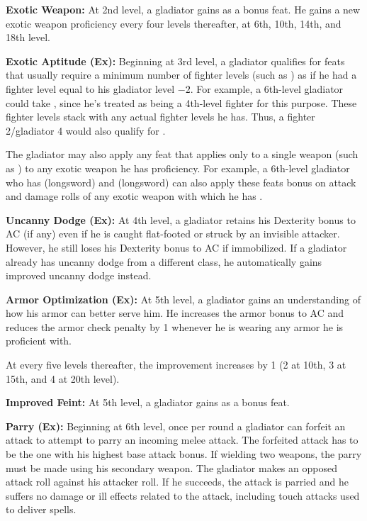 \textbf{Exotic Weapon:} At 2nd level, a gladiator gains  as a bonus feat. He gains a new exotic weapon proficiency every four levels thereafter, at 6th, 10th, 14th, and 18th level.

\textbf{Exotic Aptitude (Ex):} Beginning at 3rd level, a gladiator qualifies for feats that usually require a minimum number of fighter levels (such as ) as if he had a fighter level equal to his gladiator level $-2$. For example, a 6th-level gladiator could take , since he's treated as being a 4th-level fighter for this purpose. These fighter levels stack with any actual fighter levels he has. Thus, a fighter 2/gladiator 4 would also qualify for .

The gladiator may also apply any feat that applies only to a single weapon (such as ) to any exotic weapon he has proficiency. For example, a 6th-level gladiator who has  (longsword) and  (longsword) can also apply these feats bonus on attack and damage rolls of any exotic weapon with which he has .

\textbf{Uncanny Dodge (Ex):} At 4th level, a gladiator retains his Dexterity bonus to AC (if any) even if he is caught flat-footed or struck by an invisible attacker. However, he still loses his Dexterity bonus to AC if immobilized. If a gladiator already has uncanny dodge from a different class, he automatically gains improved uncanny dodge instead.

\textbf{Armor Optimization (Ex):} At 5th level, a gladiator gains an understanding of how his armor can better serve him. He increases the armor bonus to AC and reduces the armor check penalty by 1 whenever he is wearing any armor he is proficient with.

At every five levels thereafter, the improvement increases by 1 (2 at 10th, 3 at 15th, and 4 at 20th level).

\textbf{Improved Feint:} At 5th level, a gladiator gains  as a bonus feat.

\textbf{Parry (Ex):} Beginning at 6th level, once per round a gladiator can forfeit an attack to attempt to parry an incoming melee attack. The forfeited attack has to be the one with his highest base attack bonus. If wielding two weapons, the parry must be made using his secondary weapon. The gladiator makes an opposed attack roll against his attacker roll. If he succeeds, the attack is parried and he suffers no damage or ill effects related to the attack, including touch attacks used to deliver spells.


